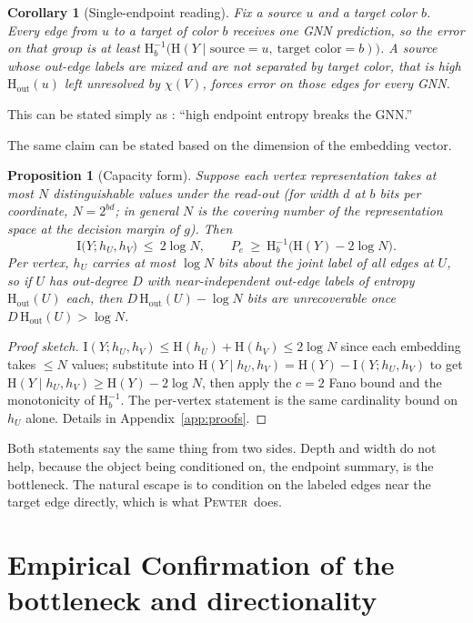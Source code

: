 \documentclass[letterpaper]{article} %
\newcommand{\method}{\textsc{Pewter}\xspace}
\newcommand{\Hh}{\mathrm{H}}
\newcommand{\MI}{\mathrm{I}}
\newcommand{\outdeg}{\mathrm{out}}
\theoremstyle{plain}
\newtheorem{proposition}{Proposition}
\newtheorem{corollary}{Corollary}
\theoremstyle{definition}
\begin{document}
\begin{corollary}[Single-endpoint reading]
\label{cor:endpoint}
Fix a source $u$ and a target color $b$. Every edge from $u$ to a target of color $b$ receives one GNN prediction, so the error on that group is at least $\Hh_b^{-1}\big(\Hh(Y\mid \text{source}{=}u,\ \text{target color}{=}b)\big)$. A source whose out-edge labels are mixed and are not separated by target color, that is high $\Hh_\outdeg(u)$ left unresolved by $\chi(V)$, forces error on those edges for every GNN. \end{corollary} This can be stated simply as : ``high endpoint entropy breaks the GNN.''

The same claim can be stated based on the dimension of the embedding vector.
\begin{proposition}[Capacity form]
\label{prop:capacity}
Suppose each vertex representation takes at most $N$ distinguishable values under the read-out (for width $d$ at $b$ bits per coordinate, $N=2^{bd}$; in general $N$ is the covering number of the representation space at the decision margin of $g$). Then
\[
\MI\big(Y;h_U,h_V\big)\ \le\ 2\log N,
\qquad
P_e\ \ge\ \Hh_b^{-1}\big(\Hh(Y)-2\log N\big).
\]
Per vertex, $h_U$ carries at most $\log N$ bits about the joint label of all edges at $U$, so if $U$ has out-degree $D$ with near-independent out-edge labels of entropy $\Hh_\outdeg(U)$ each, then $D\,\Hh_\outdeg(U)-\log N$ bits are unrecoverable once $D\,\Hh_\outdeg(U)>\log N$.
\end{proposition}

\begin{proof}[Proof sketch]
$\MI(Y;h_U,h_V)\le \Hh(h_U)+\Hh(h_V)\le 2\log N$ since each embedding takes $\le N$ values; substitute into $\Hh(Y\mid h_U,h_V)=\Hh(Y)-\MI(Y;h_U,h_V)$ to get $\Hh(Y\mid h_U,h_V)\ge \Hh(Y)-2\log N$, then apply the $c=2$ Fano bound and the monotonicity of $\Hh_b^{-1}$. The per-vertex statement is the same cardinality bound on $h_U$ alone. Details in Appendix~\ref{app:proofs}.
\end{proof}

Both statements say the same thing from two sides. Depth and width do not help, because the object being conditioned on, the endpoint summary, is the bottleneck. The natural escape is to condition on the labeled edges near the target edge directly, which is what \method\ does.

\section{Empirical Confirmation of the bottleneck and directionality}
\end{document}
